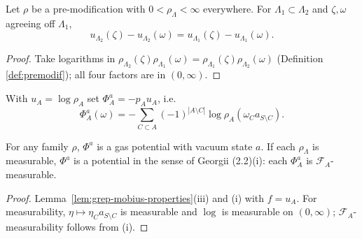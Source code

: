 \begin{lemma}
    \label{lem:grep-log-density-premod}
    \leanok

    Let $\rho$ be a pre-modification with $0 < \rho_\Lambda < \infty$ everywhere.  For
    $\Lambda_1 \subset \Lambda_2$ and $\zeta,\omega$ agreeing off $\Lambda_1$,
    \[
        u_{\Lambda_2}(\zeta) - u_{\Lambda_2}(\omega) = u_{\Lambda_1}(\zeta) - u_{\Lambda_1}(\omega).
    \]
\end{lemma}
\begin{proof}
    \leanok

    Take logarithms in
    $\rho_{\Lambda_2}(\zeta)\rho_{\Lambda_1}(\omega) = \rho_{\Lambda_1}(\zeta)\rho_{\Lambda_2}(\omega)$
    (Definition \ref{def:premodif}); all four factors are in $(0,\infty)$.
\end{proof}

\begin{definition}
    \label{def:grep-gas-potential-of-premod}
    \leanok

    With $u_A = \log \rho_A$ set $\Phi^a_A = -p_A u_A$, i.e.
    \[
        \Phi^a_A(\omega) = -\sum_{C \subset A} (-1)^{|A \setminus C|} \log \rho_A(\omega_C a_{S\setminus C}).
    \]
\end{definition}

\begin{lemma}
    \label{lem:grep-gas-potential-step2}
    \leanok

    For any family $\rho$, $\Phi^a$ is a gas potential with vacuum state $a$.  If each
    $\rho_\Lambda$ is measurable, $\Phi^a$ is a potential in the sense of Georgii (2.2)(i): each
    $\Phi^a_A$ is $\mathcal{F}_A$-measurable.
\end{lemma}
\begin{proof}
    \leanok

    Lemma~\ref{lem:grep-mobius-properties}(iii) and (i) with $f = u_A$.  For measurability,
    $\eta \mapsto \eta_C a_{S \setminus C}$ is measurable and $\log$ is measurable on
    $(0,\infty)$; $\mathcal{F}_A$-measurability follows from (i).
\end{proof}

